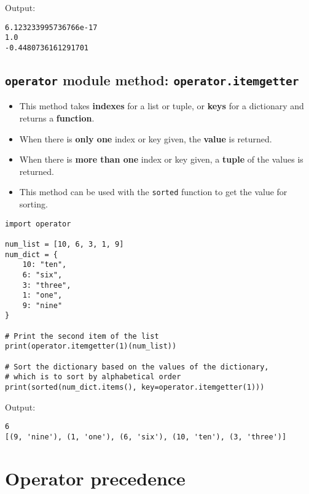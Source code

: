 \documentclass[11pt]{article}
\begin{document}
 \noindent Output:

\begin{verbatim}
6.123233995736766e-17
1.0
-0.4480736161291701
\end{verbatim}


 \newpage

\subsection{\texttt{operator} module method: \texttt{operator.itemgetter}}
\label{sec:org575fa63}
\begin{itemize}
\item This method takes \textbf{indexes} for a list or tuple, or \textbf{keys} for a dictionary and returns a \textbf{function}.
\item When there is \textbf{only one} index or key given, the \textbf{value} is returned.
\item When there is \textbf{more than one} index or key given, a \textbf{tuple} of the values is returned.
\item This method can be used with the \texttt{sorted} function to get the value for sorting.
\end{itemize}

\begin{verbatim}
import operator

num_list = [10, 6, 3, 1, 9]
num_dict = {
    10: "ten",
    6: "six",
    3: "three",
    1: "one",
    9: "nine"
}

# Print the second item of the list
print(operator.itemgetter(1)(num_list))

# Sort the dictionary based on the values of the dictionary,
# which is to sort by alphabetical order
print(sorted(num_dict.items(), key=operator.itemgetter(1)))
\end{verbatim}

 \noindent Output:

\begin{verbatim}
6
[(9, 'nine'), (1, 'one'), (6, 'six'), (10, 'ten'), (3, 'three')]
\end{verbatim}


 \newpage

\section{Operator precedence}
\label{sec:orgcc39e3d}
\end{document}
